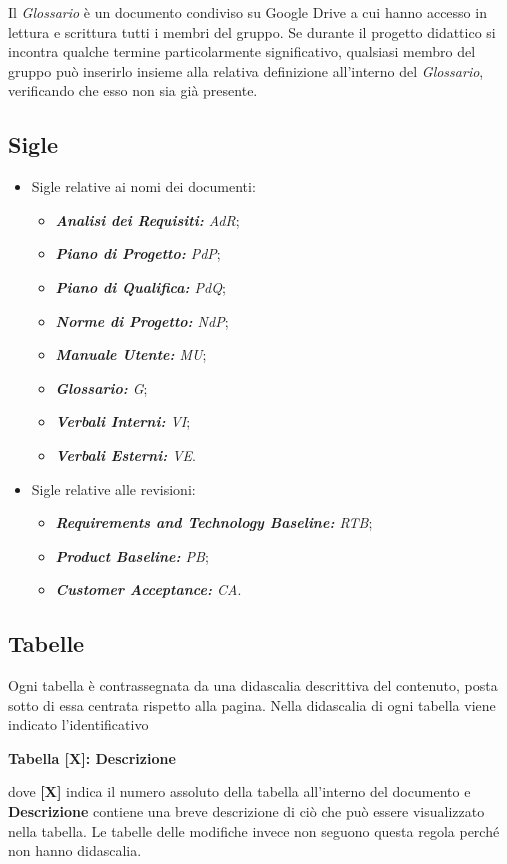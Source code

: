 Il \textit{Glossario} è un documento condiviso su Google Drive a cui hanno accesso in lettura e scrittura tutti i membri del gruppo. Se durante il progetto didattico si incontra qualche termine particolarmente significativo, qualsiasi membro del gruppo può inserirlo insieme alla relativa definizione all'interno del \textit{Glossario}, verificando che esso non sia già presente.

\subsection{Sigle}\label{sec:Sigle}
\begin{itemize}
    \item Sigle relative ai nomi dei documenti:
    \begin{itemize}
        \item \textit{\textbf{Analisi dei Requisiti:} AdR};
        \item \textit{\textbf{Piano di Progetto:} PdP};
        \item \textit{\textbf{Piano di Qualifica:} PdQ};
        \item \textit{\textbf{Norme di Progetto:} NdP};
        \item \textit{\textbf{Manuale Utente:} MU};
        \item \textit{\textbf{Glossario:} G};
        \item \textit{\textbf{Verbali Interni:} VI};
        \item \textit{\textbf{Verbali Esterni:} VE}.
    \end{itemize}
    \item Sigle relative alle revisioni:
    \begin{itemize}
        \item \textit{\textbf{Requirements and Technology Baseline:} RTB};
        \item \textit{\textbf{Product Baseline:} PB};
        \item \textit{\textbf{Customer Acceptance:} CA}.
    \end{itemize}
\end{itemize}
\subsection{Tabelle}
Ogni tabella è contrassegnata da una didascalia descrittiva del contenuto, posta sotto di essa centrata rispetto alla pagina.  Nella didascalia di ogni tabella viene indicato l’identificativo
\begin{center}
    \textbf{Tabella [X]: Descrizione}
\end{center}
dove \textbf{[X]} indica il numero assoluto della tabella all’interno del documento e \textbf{Descrizione} contiene una breve descrizione di ciò che può essere visualizzato nella tabella. Le tabelle delle modifiche invece non seguono questa regola perché non hanno didascalia.
